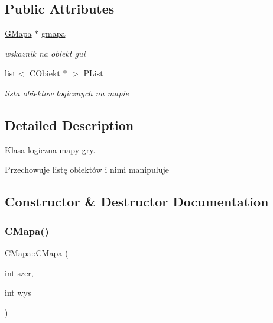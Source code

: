 \subsection*{Public Attributes}
\begin{DoxyCompactItemize}
\item 
\mbox{\label{class_c_mapa_a94174a37915e842027d62c2305bdf7ab}} 
\mbox{\hyperlink{class_g_mapa}{G\+Mapa}} $\ast$ \mbox{\hyperlink{class_c_mapa_a94174a37915e842027d62c2305bdf7ab}{gmapa}}
\begin{DoxyCompactList}\small\item\em wskaznik na obiekt gui \end{DoxyCompactList}\item 
\mbox{\label{class_c_mapa_a460aba92d936a91da33e5a0ba47100da}} 
list$<$ \mbox{\hyperlink{class_c_obiekt}{C\+Obiekt}} $\ast$ $>$ \mbox{\hyperlink{class_c_mapa_a460aba92d936a91da33e5a0ba47100da}{P\+List}}
\begin{DoxyCompactList}\small\item\em lista obiektow logicznych na mapie \end{DoxyCompactList}\end{DoxyCompactItemize}


\subsection{Detailed Description}
Klasa logiczna mapy gry. 

Przechowuje listę obiektów i nimi manipuluje 

\subsection{Constructor \& Destructor Documentation}
\mbox{\label{class_c_mapa_a52d842556392c591fc35475ef6e2c497}} 
\subsubsection{\texorpdfstring{C\+Mapa()}{CMapa()}}
{\footnotesize\ttfamily C\+Mapa\+::\+C\+Mapa (\begin{DoxyParamCaption}\item[{int}]{szer,  }\item[{int}]{wys }\end{DoxyParamCaption})}



